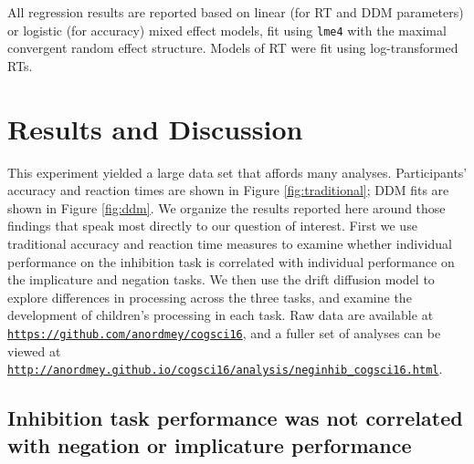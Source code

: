 \documentclass[10pt,letterpaper]{article}
\begin{document}
All regression results are reported based on linear (for RT and DDM parameters) or logistic (for accuracy) mixed effect models, fit using \texttt{lme4} with the maximal convergent random effect structure. Models of RT were fit using log-transformed RTs.


\section{Results and Discussion}

This experiment yielded a large data set that affords many analyses.  Participants' accuracy and reaction times are shown in Figure \ref{fig:traditional}; DDM fits are shown in Figure \ref{fig:ddm}. We organize the results reported here around those findings that speak most directly to our question of interest.  First we use traditional accuracy and reaction time measures to examine whether individual performance on the inhibition task is correlated with individual performance on the implicature and negation tasks. We then use the drift diffusion model to explore differences in processing across the three tasks, and examine the development of children's processing in each task.  Raw data are available at \href{https://github.com/anordmey/cogsci16}{\nolinkurl{https://github.com/anordmey/cogsci16}}, and a fuller set of analyses can be viewed at \href{http://anordmey.github.io/cogsci16/analysis/neginhib_cogsci16.html}{\nolinkurl{http://anordmey.github.io/cogsci16/analysis/neginhib_cogsci16.html}}.


\subsection{Inhibition task performance was not correlated with negation or implicature performance}
\end{document}
